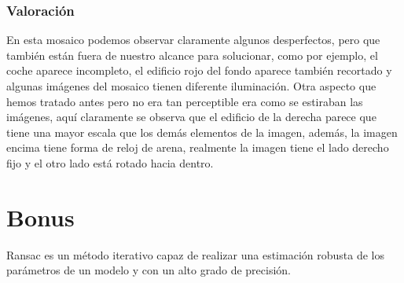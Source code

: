\documentclass{article}
\begin{document}
\subsubsection{Valoración}
En esta mosaico podemos observar claramente algunos desperfectos, pero que también están fuera de nuestro alcance para solucionar, como por ejemplo, el coche aparece incompleto, el edificio rojo del fondo aparece también recortado y algunas imágenes del mosaico tienen diferente iluminación. 
\newline
Otra aspecto que hemos tratado antes pero no era tan perceptible era como se estiraban las imágenes, aquí claramente se observa que el edificio de la derecha parece que tiene una mayor escala que los demás elementos de la imagen, además, la imagen encima tiene forma de reloj de arena, realmente la imagen tiene el lado derecho fijo y el otro lado está rotado hacia dentro. 

\newpage

\section{Bonus}
Ransac es un método iterativo capaz de realizar una estimación robusta de los parámetros de un modelo y con un alto grado de precisión.
\end{document}
